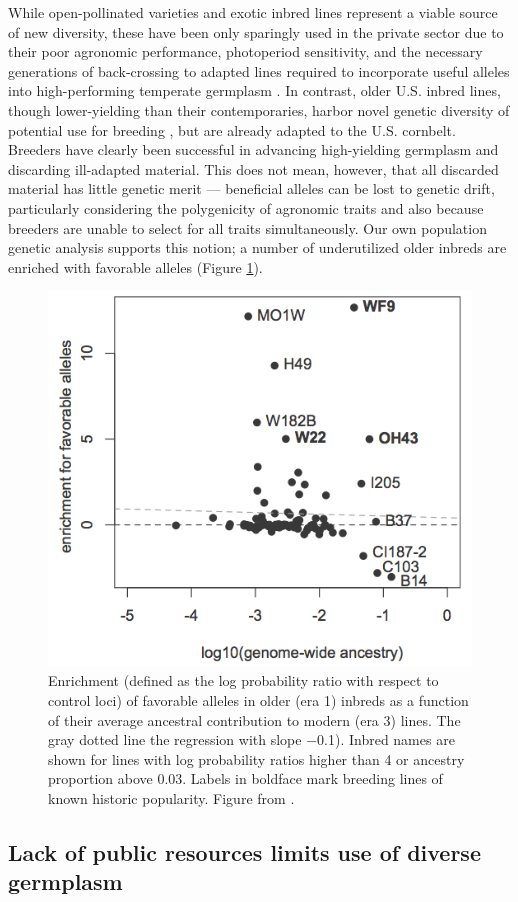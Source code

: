 \documentclass[12pt]{article}
\begin{document}
While open-pollinated varieties and exotic inbred lines represent a viable source of new diversity, these have been only sparingly used in the private sector due to their poor agronomic performance, photoperiod sensitivity, and the necessary generations of back-crossing to adapted lines required to incorporate useful alleles into high-performing temperate germplasm \citep{goodman1999broadening}.
In contrast, older U.S. inbred lines, though lower-yielding than their contemporaries, harbor novel genetic diversity of potential use for breeding \citep[e.g.][]{chen2012characterization,wisser2011multivariate}, but are already adapted to the U.S. cornbelt.  
Breeders have clearly been successful in advancing high-yielding germplasm and discarding ill-adapted material.
This does not mean, however, that all discarded material has little genetic merit --- beneficial alleles can be lost to genetic drift, particularly considering the polygenicity of agronomic traits and also because breeders are unable to select for all traits simultaneously. Our own population genetic analysis supports this notion; a number of underutilized older inbreds are enriched with favorable alleles (Figure \ref{fig:wf9}). 

\begin{figure}
\includegraphics[width=0.5\linewidth]{joost_wf9.png}
\caption{Enrichment (defined as the log probability ratio with respect to control loci) of favorable alleles in older (era 1) inbreds as a function of their average ancestral contribution to modern (era 3) lines. The gray dotted line the regression  with slope −0.1). Inbred names are shown for lines with log probability ratios higher than 4 or ancestry proportion above 0.03. Labels in boldface mark breeding lines of known historic popularity. Figure from \citet{van2012historical}.} 
\label{fig:wf9}
\end{figure}

\subsection*{Lack of public resources limits use of diverse germplasm}
\end{document}
